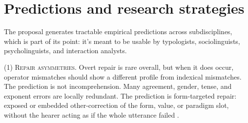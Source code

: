 \documentclass[12pt,letterpaper]{article}
\begin{document}
%
%
%

\section{Predictions and research strategies}

The proposal generates tractable empirical predictions across subdisciplines, which is part of its point: it's meant to be usable by typologists, sociolinguists, psycholinguists, and interaction analysts.

\textsc{(1) Repair asymmetries.} Overt repair is rare overall, but when it does occur, operator mismatches should show a different profile from indexical mismatches. The prediction is not incomprehension. Many agreement, gender, tense, and exponent errors are locally redundant. The prediction is form-targeted repair: exposed or embedded other-correction of the form, value, or paradigm slot, without the hearer acting as if the whole utterance failed \citep{schegloffjeffersonsacks1977}.
\end{document}
